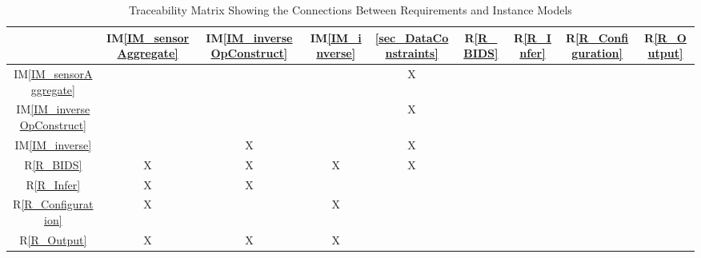 \documentclass[12pt]{article}
\newcommand{\iref}[1]{IM\ref{#1}}
\newcommand{\rref}[1]{R\ref{#1}}
\begin{document}
\begin{table}[h!]
\centering
\begin{tabular}{|c|c|c|c|c|c|c|c|c|}
\hline
	& \iref{IM_sensorAggregate}& \iref{IM_inverseOpConstruct}& \iref{IM_inverse}& \ref{sec_DataConstraints}& \rref{R_BIDS}& \rref{R_Infer}& \rref{R_Configuration}& \rref{R_Output} \\
\hline
    \iref{IM_sensorAggregate}    & & & & X& & & & \\ \hline
    \iref{IM_inverseOpConstruct} & & & & X& & & & \\ \hline
    \iref{IM_inverse}            & & X& & X& & & & \\ \hline
    \rref{R_BIDS}                & X& X& X& X& & & & \\ \hline
    \rref{R_Infer}               & X& X& & & & & & \\ \hline
    \rref{R_Configuration}       & X& & X& & & & & \\ \hline
    \rref{R_Output}              & X& X& X& & & & & \\
\hline
\end{tabular}
\caption{Traceability Matrix Showing the Connections Between Requirements and Instance Models}
\label{Table:R_trace}
\end{table}






\end{document}
